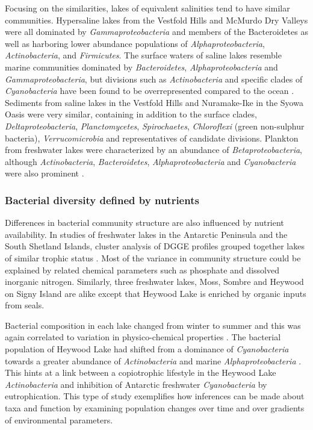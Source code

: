 Focusing on the similarities, lakes of equivalent salinities tend to have similar communities.
Hypersaline lakes from the Vestfold Hills \cite{Bowman2000} and McMurdo Dry Valleys \cite{Glatz2006, Mosier2007} were all dominated by \emph{Gammaproteobacteria} and members of the Bacteroidetes
 as well as harboring lower abundance populations of \emph{Alphaproteobacteria}, \emph{Actinobacteria}, and \emph{Firmicutes}.
The surface waters of saline lakes resemble marine communities dominated by \emph{Bacteroidetes}, \emph{Alphaproteobacteria} and \emph{Gammaproteobacteria},
 but divisions such as \emph{Actinobacteria} and specific clades of \emph{Cyanobacteria} have been found to be overrepresented compared to the ocean \cite{Lauro2011}.
Sediments from saline lakes in the Vestfold Hills \cite{Bowman2000a} and Nuramake-Ike in the Syowa Oasis \cite{Kurosawa2010} were very similar, 
containing in addition to the surface clades, \emph{Deltaproteobacteria}, \emph{Planctomycetes}, \emph{Spirochaetes}, \emph{Chloroflexi} (green non-sulphur bacteria), \emph{Verrucomicrobia} and representatives of candidate divisions.
Plankton from freshwater lakes were characterized by an abundance of \emph{Betaproteobacteria}, although \emph{Actinobacteria}, \emph{Bacteroidetes}, \emph{Alphaproteobacteria} and \emph{Cyanobacteria} were also prominent \cite{Pearce2003a, Pearce2005a, Pearce2005b, Schiaffino2009}. 

\subsubsection{Bacterial diversity defined by nutrients}
Differences in bacterial community structure are also influenced by nutrient availability.
In studies of freshwater lakes in the Antarctic Peninsula and the South Shetland Islands, cluster analysis of \ac{DGGE} profiles grouped together lakes of similar trophic status 
\cite{Schiaffino2009, Villaescusa2010}.
Most of the variance in community structure could be explained by related chemical parameters such as phosphate and dissolved inorganic nitrogen.
Similarly, three freshwater lakes, Moss, Sombre and Heywood on Signy Island are alike except that Heywood Lake is enriched by organic inputs from seals.

Bacterial composition in each lake changed from winter to summer and this was again correlated to variation in physico-chemical properties \cite{Pearce2005a}. 
The bacterial population of Heywood Lake had shifted from a dominance of \emph{Cyanobacteria} towards a greater abundance of \emph{Actinobacteria} and marine \emph{Alphaproteobacteria} \cite{Pearce2005b}.
This hints at a link between a copiotrophic lifestyle in the Heywood Lake \emph{Actinobacteria} and inhibition of Antarctic freshwater \emph{Cyanobacteria} by eutrophication. 
This type of study exemplifies how inferences can be made about taxa and function by examining population changes over time and over gradients of environmental parameters.

